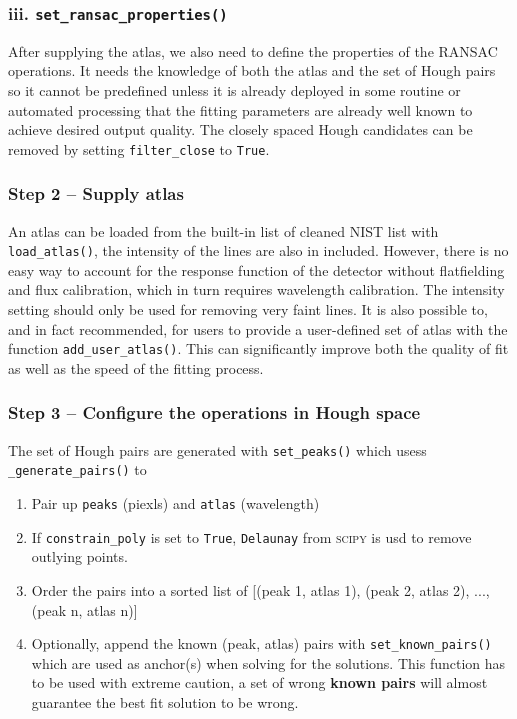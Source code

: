 \documentclass{aa}
\begin{document}
\subsubsection*{iii. \texttt{set\_ransac\_properties()}}
After supplying the atlas, we also need to define the properties of the RANSAC
operations. It needs the knowledge of both the atlas and the set of Hough pairs
so it cannot be predefined unless it is already deployed in some routine or
automated processing that the fitting parameters are already well known to
achieve desired output quality. The closely spaced Hough candidates can be
removed by setting \texttt{filter\_close} to \texttt{True}.

\subsubsection*{Step 2 -- Supply atlas}
An atlas can be loaded from the built-in list of cleaned NIST list with
\texttt{load\_atlas()}, the intensity of the lines are also in included.
However, there is no easy way to account for the response function of
the detector without flatfielding and flux calibration, which in turn
requires wavelength calibration. The intensity setting should only be
used for removing very faint lines. It is also possible to, and in fact
recommended, for users to provide a user-defined set of atlas with the
function \texttt{add\_user\_atlas()}. This can significantly improve
both the quality of fit as well as the speed of the fitting process.

\subsubsection*{Step 3 -- Configure the operations in Hough space}
The set of Hough pairs are generated with \texttt{set\_peaks()} which usess
\texttt{\_generate\_pairs()} to
\begin{enumerate}
    \item Pair up \texttt{peaks} (piexls) and \texttt{atlas} (wavelength)
    \item If \texttt{constrain\_poly} is set to \texttt{True},
        \texttt{Delaunay} from \textsc{scipy} is usd to remove outlying points.
    \item Order the pairs into a sorted list of [(peak 1, atlas 1),
        (peak 2, atlas 2), ..., (peak n, atlas n)]
    \item Optionally, append the known (peak, atlas) pairs with
        \texttt{set\_known\_pairs()} which are used as anchor(s) when solving
            for the solutions. This function has to be used with extreme
            caution, a set of wrong \textbf{known pairs} will almost guarantee
            the best fit solution to be wrong.
\end{enumerate}
\end{document}
